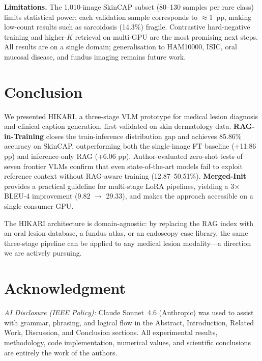 \documentclass[conference,a4paper]{IEEEtran}
\begin{document}
\textbf{Limitations.}
The 1,010-image SkinCAP subset (80--130 samples per rare class) limits
statistical power; each validation sample corresponds to $\approx$1~pp,
making low-count results such as sarcoidosis (14.3\%) fragile.
Contrastive hard-negative training and higher-$K$ retrieval on multi-GPU
are the most promising next steps.
All results are on a single domain; generalisation to HAM10000, ISIC, oral
mucosal disease, and fundus imaging remains future work.

\section{Conclusion}

We presented HIKARI, a three-stage VLM prototype for medical lesion
diagnosis and clinical caption generation, first validated on skin
dermatology data.  \textbf{RAG-in-Training} closes the train-inference
distribution gap and achieves 85.86\% accuracy on SkinCAP, outperforming
both the single-image FT baseline (+11.86 pp) and inference-only RAG
(+6.06 pp).  Author-evaluated zero-shot tests of seven frontier VLMs
confirm that even state-of-the-art models fail to exploit reference
context without RAG-aware training (12.87--50.51\%).
\textbf{Merged-Init} provides a practical guideline for multi-stage
LoRA pipelines, yielding a 3$\times$ BLEU-4 improvement
(9.82 $\rightarrow$ 29.33), and makes the approach accessible on a
single consumer GPU.

The HIKARI architecture is domain-agnostic: by replacing the RAG index
with an oral lesion database, a fundus atlas, or an endoscopy case
library, the same three-stage pipeline can be applied to any medical
lesion modality---a direction we are actively pursuing.

\section*{Acknowledgment}

\textit{AI Disclosure (IEEE Policy):} Claude Sonnet~4.6 (Anthropic) was
used to assist with grammar, phrasing, and logical flow in the Abstract,
Introduction, Related Work, Discussion, and Conclusion sections.
All experimental results, methodology, code implementation, numerical
values, and scientific conclusions are entirely the work of the authors.
\end{document}
